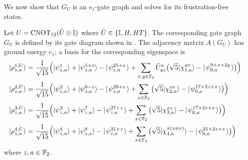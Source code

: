 \documentclass[../thesis-main/thesis-main]{subfiles}
\begin{document}
We now show that $G_{U}$ is an $e_{1}$-gate graph and solves for its frustration-free states.

\begin{lemma}\label{lem:2qub_gate}
Let $U=\mathrm{CNOT}_{12}(\tilde U\otimes\mathbb{I})$ where $\tilde U\in\{\mathbb{I},H,HT\}$. The corresponding gate graph $G_U$ is defined by its gate diagram shown in . The adjacency matrix $A(G_U)$ has ground energy $e_{1}$; a basis for the corresponding eigenspace is
\begin{align}
  |\rho_{z,a}^{1,U}\rangle & =\frac{1}{\sqrt{15}}\Big(|\psi_{z,a}^{1}\rangle+|\psi_{z,a}^{5+z}\rangle - |\mspace{2mu} \psi_{z,a}^{25+z} \mspace{2mu} \rangle
  	+\sum_{x,y\in\mathbb{F}_2}\tilde U^a_{yz}\big(\sqrt{5}  |\chi_{1,a}^{yx}\rangle-|\mspace{2mu} \psi_{0,a}^{9+x + 2y} \mspace{2mu} \rangle \big) \Big)\label{eq:rho1}\
 \\
  |\rho_{z,a}^{2,U}\rangle & = \frac{1}{\sqrt{15}}\Big(|\psi_{z,a}^{2}\rangle+|\psi_{z,a}^{6-z}\rangle -|\mspace{2mu} \psi_{z,a}^{29+z} \mspace{2mu} \rangle
  	+\sum_{x\in\mathbb{F}_2} \big(\sqrt{5} |\chi_{2,a}^{zx}\rangle - |\mspace{2mu} \psi_{0,a}^{17+2z + x} \mspace{2mu} \rangle\big)\Big)\label{eq:rho2}\\
  |\rho_{z,a}^{3,U}\rangle & = \frac{1}{\sqrt{15}}\Big(|\psi_{z,a}^{3}\rangle+|\psi_{z,a}^{7}\rangle  -|\mspace{2mu} \psi_{z,a}^{27+z} \mspace{2mu} \rangle
  	+\sum_{x\in\mathbb{F}_2}\big(\sqrt{5} |\chi_{3,a}^{xz}\rangle- |\mspace{2mu} \psi_{0,a}^{17+2z + x} \mspace{2mu} \rangle\big)\Big) \label{eq:rho3} \\
  |\rho_{z,a}^{4,U}\rangle & =\frac{1}{\sqrt{15}}\Big(|\psi_{z,a}^{4}\rangle+|\psi_{z,a}^{8}\rangle -|\mspace{2mu} \psi_{z,a}^{31+z} \mspace{2mu} \rangle
  	+\sum_{x\in\mathbb{F}_2}\big(\sqrt{5}|\chi_{4,a}^{x\left(z\oplus x\right)}\rangle - |\mspace{2mu} \psi_{0,a}^{21+2z + x} \mspace{2mu} \rangle  \big)\Big)\label{eq:rho4}
\end{align}
where $z,a\in\mathbb{F}_2$.
\end{lemma}
\end{document}
